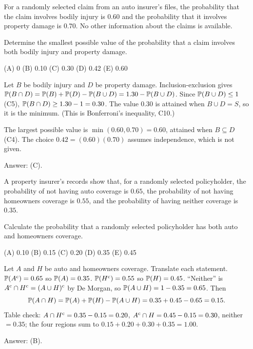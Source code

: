 \begin{example}
For a randomly selected claim from an auto insurer's files, the probability that
the claim involves bodily injury is $0.60$ and the probability that it involves
property damage is $0.70$. No other information about the claims is available.

Determine the smallest possible value of the probability that a claim involves
both bodily injury and property damage.

(A) 0 \quad (B) 0.10 \quad (C) 0.30 \quad (D) 0.42 \quad (E) 0.60
\end{example}
\begin{solution}
Let $B$ be bodily injury and $D$ be property damage. Inclusion-exclusion gives
$\mathbb{P}(B \cap D) = \mathbb{P}(B) + \mathbb{P}(D) - \mathbb{P}(B \cup D) = 1.30 - \mathbb{P}(B \cup D)$.
Since $\mathbb{P}(B \cup D) \le 1$ (C5), $\mathbb{P}(B \cap D) \ge 1.30 - 1 = 0.30$. The
value $0.30$ is attained when $B \cup D = S$, so it is the minimum. (This is
Bonferroni's inequality, C10.)

The largest possible value is $\min(0.60, 0.70) = 0.60$, attained when
$B \subseteq D$ (C4). The choice $0.42 = (0.60)(0.70)$ assumes independence, which
is not given.

Answer: (C).
\end{solution}

\begin{example}
A property insurer's records show that, for a randomly selected policyholder, the
probability of not having auto coverage is $0.65$, the probability of not having
homeowners coverage is $0.55$, and the probability of having neither coverage is
$0.35$.

Calculate the probability that a randomly selected policyholder has both auto and
homeowners coverage.

(A) 0.10 \quad (B) 0.15 \quad (C) 0.20 \quad (D) 0.35 \quad (E) 0.45
\end{example}
\begin{solution}
Let $A$ and $H$ be auto and homeowners coverage. Translate each statement.
$\mathbb{P}(A^{\mathrm{c}}) = 0.65$ so $\mathbb{P}(A) = 0.35$.
$\mathbb{P}(H^{\mathrm{c}}) = 0.55$ so $\mathbb{P}(H) = 0.45$.
``Neither'' is $A^{\mathrm{c}} \cap H^{\mathrm{c}} = (A \cup H)^{\mathrm{c}}$ by De Morgan, so
$\mathbb{P}(A \cup H) = 1 - 0.35 = 0.65$.
Then
\[
  \mathbb{P}(A \cap H) = \mathbb{P}(A) + \mathbb{P}(H) - \mathbb{P}(A \cup H) = 0.35 + 0.45 - 0.65 = 0.15 .
\]
Table check: $A \cap H^{\mathrm{c}} = 0.35 - 0.15 = 0.20$, $A^{\mathrm{c}} \cap H = 0.45 - 0.15 = 0.30$,
neither $= 0.35$; the four regions sum to $0.15 + 0.20 + 0.30 + 0.35 = 1.00$.

Answer: (B).
\end{solution}

